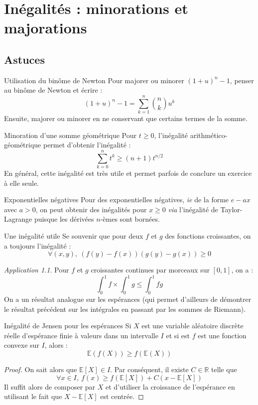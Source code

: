 \documentclass[french]{book}
\newcommand{\R}{\mathbb{R}}
\newcommand{\E}{\mathbb{E}}
\theoremstyle{plain}
\theoremstyle{definition}
\theoremstyle{remark}
\newtheorem*{app}{Application}
\begin{document}
\chapter{Inégalités : minorations et majorations}
\localtableofcontents
\section{Astuces}
\begin{AS}{Utilisation du binôme de Newton} Pour majorer ou minorer $(1+u)^n-1$, penser au binôme de Newton et écrire : $$(1+u)^n-1=\sum_{k=1}^{n}\binom{n}{k}u^k$$ Ensuite, majorer ou minorer en ne conservant que certains termes de la somme.
\end{AS}
\begin{AS}{Minoration d'une somme géométrique} Pour $t\geqslant0$, l'inégalité arithmético-géométrique permet d'obtenir l'inégalité : $$\sum_{k=0}^{n}t^k\geqslant(n+1)t^{n/2}$$ En général, cette inégalité est très utile et permet parfois de conclure un exercice à elle seule.
\end{AS}
\begin{AS}{Exponentielles négatives} Pour des exponentielles négatives, \textit{ie} de la forme $e-{ax}$ avec $a>0$, on peut obtenir des inégalités pour $x\geqslant0$ \textit{via} l'inégalité de Taylor-Lagrange puisque les dérivées $n$-èmes sont bornées.
\end{AS}
\begin{AS}{Une inégalité utile} Se souvenir que pour deux $f$ et $g$ des fonctions croissantes, on a toujours l'inégalité : $$\forall (x,y),\ (f(y)-f(x))(g(y)-g(x))\geqslant0$$
\end{AS}
\begin{app}
	Pour $f$ et $g$ croissantes continues par morceaux sur $[0,1]$, on a : $$\int_{0}^{1}f\times \int_{0}^{1}g\leqslant \int_{0}^{1}fg$$
	On a un résultat analogue sur les espérances (qui permet d'ailleurs de démontrer le résultat précédent sur les intégrales en passant par les sommes de Riemann).
\end{app}
\begin{AS}{Inégalité de Jensen pour les espérances} Si $X$ est une variable aléatoire discrète réelle d'espérance finie à valeurs dans un intervalle $I$ et si est $f$ est une fonction convexe sur $I$, alors : $$\E(f(X))\geqslant f\left(\E(X)\right)$$
\end{AS}
\begin{proof}
	On sait alors que $\E[X]\in I$. Par conséquent, il existe $C\in\R$ telle que $$\forall x\in I,\ f(x)\geqslant f(\E[X])+C(x-\E[X])$$ Il suffit alors de composer par $X$ et d'utiliser la croissance de l'espérance en utilisant le fait que $X-\E[X]$ est centrée.
\end{proof}
\end{document}
